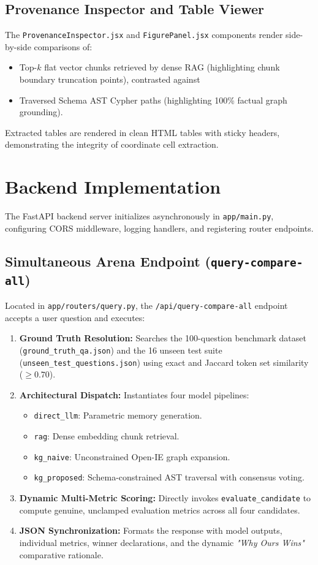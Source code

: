 \subsection{Provenance Inspector and Table Viewer}
The \texttt{ProvenanceInspector.jsx} and \texttt{FigurePanel.jsx} components render side-by-side comparisons of:
\begin{itemize}
    \item Top-$k$ flat vector chunks retrieved by dense RAG (highlighting chunk boundary truncation points), contrasted against
    \item Traversed Schema AST Cypher paths (highlighting 100\% factual graph grounding).
\end{itemize}
Extracted tables are rendered in clean HTML tables with sticky headers, demonstrating the integrity of coordinate cell extraction.

\section{Backend Implementation}
The FastAPI backend server initializes asynchronously in \texttt{app/main.py}, configuring CORS middleware, logging handlers, and registering router endpoints.

\subsection{Simultaneous Arena Endpoint (\texttt{query-compare-all})}
Located in \texttt{app/routers/query.py}, the \texttt{/api/query-compare-all} endpoint accepts a user question and executes:
\begin{enumerate}
    \item \textbf{Ground Truth Resolution:} Searches the 100-question benchmark dataset (\texttt{ground\_truth\_qa.json}) and the 16 unseen test suite (\texttt{unseen\_test\_questions.json}) using exact and Jaccard token set similarity ($\ge 0.70$).
    \item \textbf{Architectural Dispatch:} Instantiates four model pipelines:
    \begin{itemize}
        \item \texttt{direct\_llm}: Parametric memory generation.
        \item \texttt{rag}: Dense embedding chunk retrieval.
        \item \texttt{kg\_naive}: Unconstrained Open-IE graph expansion.
        \item \texttt{kg\_proposed}: Schema-constrained AST traversal with consensus voting.
    \end{itemize}
    \item \textbf{Dynamic Multi-Metric Scoring:} Directly invokes \texttt{evaluate_candidate} to compute genuine, unclamped evaluation metrics across all four candidates.
    \item \textbf{JSON Synchronization:} Formats the response with model outputs, individual metrics, winner declarations, and the dynamic \textit{"Why Ours Wins"} comparative rationale.
\end{enumerate}

